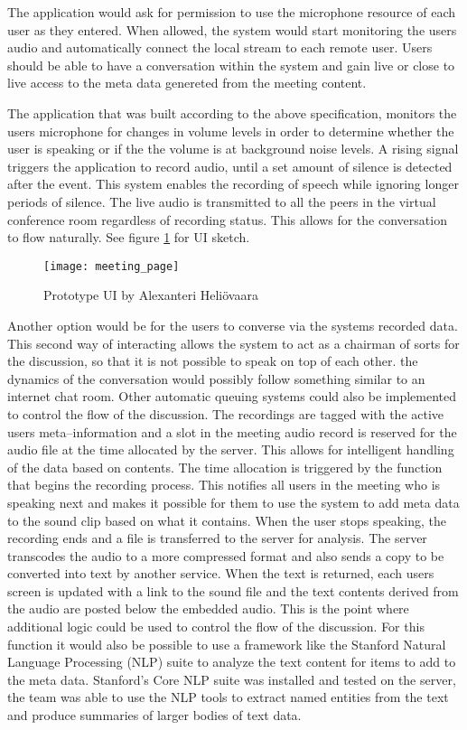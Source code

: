 \documentclass[english,12pt,a4paper,pdftex]{article}
\begin{document}
The application would ask for permission to use the microphone resource of each user as they entered. When allowed, the system would start monitoring the users audio and automatically connect the local stream to each remote user. Users should be able to have a conversation within the system and gain live or close to live access to the meta data genereted from the meeting content.

The application that was built according to the above specification, monitors the users microphone for changes in volume levels in order to determine whether the user is speaking or if the the volume is at background noise levels. A rising signal triggers the application to record audio, until a set amount of silence is detected after the event. This system enables the recording of speech while ignoring longer periods of silence. The live audio is transmitted to all the peers in the virtual conference room regardless of recording status. This allows for the conversation to flow naturally. See figure \ref{fig:meeting_page} for UI sketch.

\begin{figure}[H]

\centering \texttt{[image: meeting\_page]}
\caption{Prototype UI by Alexanteri Heliövaara}
\label{fig:meeting_page}

\end{figure}


Another option would be for the users to converse via the systems recorded data. This second way of interacting allows the system to act as a chairman of sorts for the discussion, so that it is not possible to speak on top of each other. the dynamics of the conversation would possibly follow something similar to an internet chat room. Other automatic queuing systems could also be implemented to control the flow of the discussion. The recordings are tagged with the active users meta--information and a slot in the meeting audio record is reserved for the audio file at the time allocated by the server. This allows for intelligent handling of the data based on contents. The time allocation is triggered by the function that begins the recording process. This notifies all users in the meeting who is speaking next and makes it possible for them to use the system to add meta data to the sound clip based on what it contains. When the user stops speaking, the recording ends and a file is transferred to the server for analysis. The server transcodes the audio to a more compressed format and also sends a copy to be converted into text by another service. When the text is returned, each users screen is updated with a link to the sound file and the text contents derived from the audio are posted below the embedded audio. This is the point where additional logic could be used to control the flow of the discussion. For this function it would also be possible to use a framework like the Stanford Natural Language Processing (NLP) suite to analyze the text content for items to add to the meta data. Stanford's Core NLP suite was installed and tested on the server, the team was able to use the NLP tools to extract named entities from the text and produce summaries of larger bodies of text data.
\end{document}
